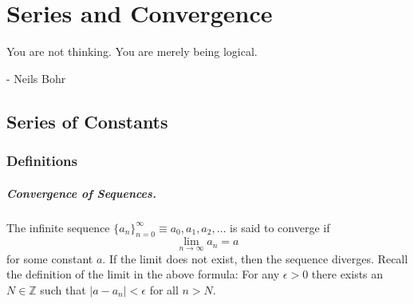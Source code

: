 
\flushbottom


\chapter{Series and Convergence}
\label{chapter_sc}




You are not thinking. You are merely being logical.

\begin{flushright}
  - Neils Bohr
\end{flushright}





\section{Series of Constants}


\subsection{Definitions}


\paragraph{Convergence of Sequences.}
The infinite sequence $\{a_n\}_{n=0}^\infty \equiv a_0, a_1, a_2, \ldots$ 
is said to converge if
\[ 
\lim_{n \to \infty} a_n = a
\]
for some constant $a$.
If the limit does not exist, then the sequence diverges.
Recall the definition of the limit in the above formula:  For any
$\epsilon > 0$ there exists an $N \in \mathbb{Z}$ such that
$|a - a_n| < \epsilon$ for all $n > N$.



